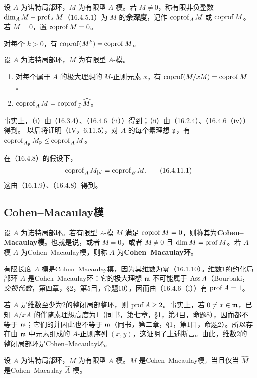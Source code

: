 设 $A$ 为诺特局部环，$M$ 为有限型 $A$-模。若 $M\ne0$，称有限非负整数
$\dim_A M-\operatorname{prof}_A M$（16.4.5.1）为 $M$ 的\textbf{余深度}，记作 $\operatorname{coprof}_A M$ 或 $\operatorname{coprof} M$。若 $M=0$，置 $\operatorname{coprof} M=0$。

对每个 $k>0$，有 $\operatorname{coprof}(M^k)=\operatorname{coprof} M$。

设 $A$ 为诺特局部环，$M$ 为有限型 $A$-模。
\begin{enumerate}[label=(\roman*)]
 \item 对每个属于 $A$ 的极大理想的 $M$-正则元素 $x$，有
 $\operatorname{coprof}(M/xM)=\operatorname{coprof} M$。
 \item $\operatorname{coprof}_A M=\operatorname{coprof}_{\widehat A}\widehat M$。
\end{enumerate}
事实上，（i）由（16.3.4）、（16.4.6（ii））得到；（ii）由（16.2.4）、（16.4.6（iv））得到。
以后将证明（IV，6.11.5），对 $A$ 的每个素理想 $\mathfrak p$，有
$\operatorname{coprof}_{A_{\mathfrak p}}M_{\mathfrak p}\leq\operatorname{coprof}_A M$。

在（16.4.8）的假设下，
\begin{equation}
 \operatorname{coprof}_A M_{[\rho]}=\operatorname{coprof}_B M.
 \tag{16.4.11.1}
\end{equation}
这由（16.1.9）、（16.4.8）得到。

\subsection{Cohen--Macaulay模}

设 $A$ 为诺特局部环。若有限型 $A$-模 $M$ 满足 $\operatorname{coprof} M=0$，则称其为\textbf{Cohen--Macaulay模}。也就是说，或者 $M=0$，或者 $M\ne0$ 且 $\dim M=\operatorname{prof} M$。若 $A$-模 $A$ 为Cohen--Macaulay模，则称 $A$ 为\textbf{Cohen--Macaulay环}。

有限长度 $A$-模是Cohen--Macaulay模，因为其维数为零（16.1.10）。维数1的约化局部环 $A$ 是Cohen--Macaulay环：它的极大理想 $\mathfrak m$ 不可能属于 $\operatorname{Ass} A$（Bourbaki，\textit{交换代数}，第四章，§2，第5目，命题10），因而由（16.4.6（i））有 $\operatorname{prof} A=1$。

若 $A$ 是维数至少为2的整闭局部整环，则 $\operatorname{prof} A\geq2$。事实上，若 $0\ne x\in\mathfrak m$，已知 $A/xA$ 的伴随素理想高度为1（同书，第七章，§1，第4目，命题8），因而都不等于 $\mathfrak m$；它们的并因此也不等于 $\mathfrak m$（同书，第二章，§1，第1目，命题2）。所以存在由 $\mathfrak m$ 中元素组成的 $A$-正则序列 $(x,y)$，这证明了上述断言。由此，维数2的整闭局部环是Cohen--Macaulay环。

设 $A$ 为诺特局部环，$M$ 为有限型 $A$-模。$M$ 是Cohen--Macaulay模，当且仅当 $\widehat M$ 是Cohen--Macaulay $\widehat A$-模。

